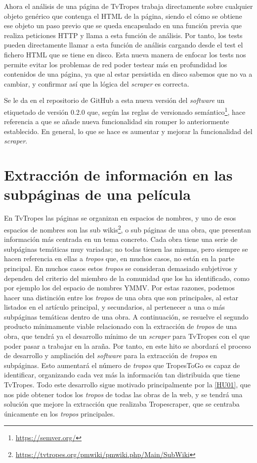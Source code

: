 Ahora el análisis de una página de TvTropes trabaja directamente sobre cualquier
objeto genérico que contenga el HTML de la página, siendo el cómo se obtiene ese
objeto un paso previo que se queda encapsulado en una función previa que realiza
peticiones HTTP y llama a esta función de análisis. Por tanto, los tests pueden
directamente llamar a esta función de análisis cargando desde el test el fichero
HTML que se tiene en disco. Esta nueva manera de enfocar los tests nos permite
evitar los problemas de red poder testear más en profundidad los contenidos de
una página, ya que al estar persistida en disco sabemos que no va a cambiar, y
confirmar así que la lógica del \textit{scraper} es correcta.

Se le da en el repositorio de GitHub a esta nueva versión del \textit{software}
un etiquetado de versión 0.2.0 que, según las reglas de versionado
semántico\footnote{\url{https://semver.org/}}, hace referencia a que se añade
nueva funcionalidad sin romper lo anteriormente establecido. En general, lo que
se hace es aumentar y mejorar la funcionalidad del \textit{scraper}.

\section{Extracción de información en las subpáginas de una película}
En TvTropes las páginas se organizan en espacios de nombres, y uno de esos
espacios de nombres son las sub
wikis\footnote{\url{https://tvtropes.org/pmwiki/pmwiki.php/Main/SubWiki}}, o sub
páginas de una obra, que presentan información más centrada en un tema concreto.
Cada obra tiene una serie de subpáginas temáticas muy variadas; no todas tienen
las mismas, pero siempre se hacen referencia en ellas a \textit{tropos} que, en
muchos casos, no están en la parte principal. En muchos casos estos
\textit{tropos} se consideran demasiado subjetivos y dependen del criterio del
miembro de la comunidad que los ha identificado, como por ejemplo los del
espacio de nombres YMMV. Por estas razones, podemos hacer una distinción entre
los \textit{tropos} de una obra que son principales, al estar listados en el
artículo principal, y secundarios, al pertenecer a una o más subpáginas
temáticas dentro de una obra. A continuación, se resuelve el segundo producto
mínimamente viable relacionado con la extracción de \textit{tropos} de una obra,
que tendrá ya el desarrollo mínimo de un \textit{scraper} para TvTropes con el
que poder pasar a trabajar en la araña. Por tanto, en este hito se abordará el
proceso de desarrollo y ampliación del \textit{software} para la extracción de
\textit{tropos} en subpáginas. Esto aumentará el número de \textit{tropos} que
TropesToGo es capaz de identificar, organizando cada vez más la información tan
distribuida que tiene TvTropes. Todo este desarrollo sigue motivado
principalmente por la
\href{https://github.com/jlgallego99/TropesToGo/issues/6}{[HU01]}, que nos pide
obtener todos los \textit{tropos} de todas las obras de la web, y se tendrá una
solución que mejore la extracción que realizaba Tropescraper, que se centraba
únicamente en los \textit{tropos} principales.

